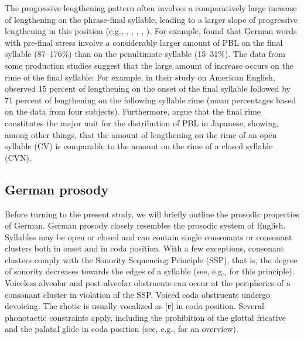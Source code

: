 \documentclass[output=paper]{langscibook}
\begin{document}
The progressive lengthening pattern often involves a comparatively large increase of lengthening on the phrase-final syllable, leading to a larger slope of progressive lengthening in this position (e.g., \citealt{Klatt1975}, \citealt{Kohler1983}, \citealt{Berkovits1994}, \citealt{TurkShattuck-Hufnagel2007}, \citealt{SeoEtal2019}).  For example, \citet{Kohler1983} found that German words with pre-final stress involve a considerably larger amount of PBL on the final syllable (87--176\%) than on the penultimate syllable (15--31\%). The data from some production studies suggest that the large amount of increase occurs on the rime of the final syllable: For example, in their study on American English, \citet{TurkShattuck-Hufnagel2007} observed 15 percent of lengthening on the onset of the final syllable followed by 71 percent of lengthening on the following syllable rime (mean percentages based on the data from four subjects). Furthermore, \citet{SeoEtal2019} argue that the final rime constitutes the major unit for the distribution of PBL in Japanese, showing, among other things, that the amount of lengthening on the rime of an open syllable (CV) is comparable to the amount on the rime of a closed syllable (CVN). %

\subsection{German prosody}
Before turning to the present study, we will briefly outline the prosodic properties of German. German prosody closely resembles the prosodic system of English. Syllables may be open or closed and can contain single consonants or consonant clusters both in onset and in coda position. With a few exceptions, consonant clusters comply with the Sonority Sequencing Principle (SSP), that is, the degree of sonority decreases towards the edges of a syllable (see, e.g., \citealt{Selkirk1984} for this principle). Voiceless alveolar and post-alveolar obstruents can occur at the peripheries of a consonant cluster in violation of the SSP. Voiced coda obstruents undergo devoicing. The rhotic is usually vocalized as [ɐ] in coda position. Several phonotactic constraints apply, including the prohibition of the glottal fricative and the palatal glide in coda position (see, e.g., \citealt{Hall1992} for an overview).
\end{document}
